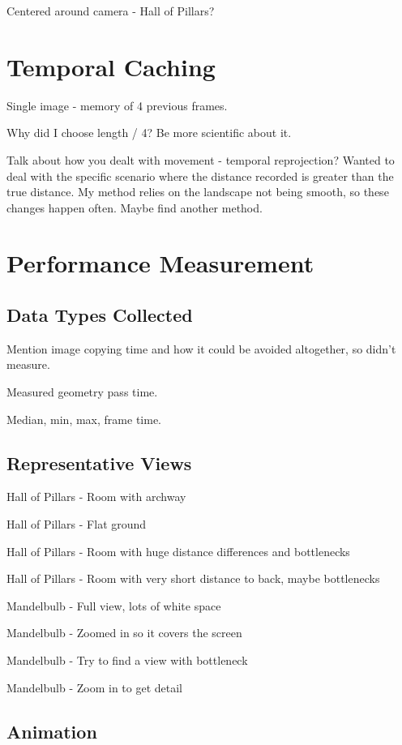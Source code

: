 Centered around camera - Hall of Pillars?

\section{Temporal Caching}

Single image - memory of 4 previous frames.

Why did I choose length / 4? Be more scientific about it.

Talk about how you dealt with movement - temporal reprojection? Wanted to deal with the specific scenario where the distance recorded is greater than the true distance. My method relies on the landscape not being smooth, so these changes happen often. Maybe find another method.

\section{Performance Measurement}

\subsection{Data Types Collected}

Mention image copying time and how it could be avoided altogether, so didn't measure.

Measured geometry pass time.

Median, min, max, frame time.

\subsection{Representative Views}

Hall of Pillars - Room with archway

Hall of Pillars - Flat ground

Hall of Pillars - Room with huge distance differences and bottlenecks

Hall of Pillars - Room with very short distance to back, maybe bottlenecks

Mandelbulb - Full view, lots of white space

Mandelbulb - Zoomed in so it covers the screen

Mandelbulb - Try to find a view with bottleneck

Mandelbulb - Zoom in to get detail

\subsection{Animation}

